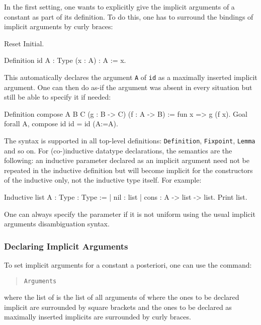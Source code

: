 In the first setting, one wants to explicitly give the implicit
arguments of a constant as part of its definition. To do this, one has
to surround the bindings of implicit arguments by curly braces:
\begin{coq_eval}
Reset Initial.
\end{coq_eval}
\begin{coq_example}
Definition id {A : Type} (x : A) : A := x.
\end{coq_example}

This automatically declares the argument {\tt A} of {\tt id} as a
maximally inserted implicit argument. One can then do as-if the argument
was absent in every situation but still be able to specify it if needed:
\begin{coq_example}
Definition compose {A B C} (g : B -> C) (f : A -> B) := 
  fun x => g (f x).
Goal forall A, compose id id = id (A:=A).
\end{coq_example}

The syntax is supported in all top-level definitions: {\tt Definition},
{\tt Fixpoint}, {\tt Lemma} and so on. For (co-)inductive datatype
declarations, the semantics are the following: an inductive parameter
declared as an implicit argument need not be repeated in the inductive
definition but will become implicit for the constructors of the
inductive only, not the inductive type itself. For example:

\begin{coq_example}
Inductive list {A : Type} : Type :=
| nil : list
| cons : A -> list -> list.
Print list.
\end{coq_example}

One can always specify the parameter if it is not uniform using the
usual implicit arguments disambiguation syntax.

\subsubsection{Declaring Implicit Arguments}

To set implicit arguments for a constant a posteriori, one can use the
command:
\begin{quote}
\tt Arguments {\qualid} \nelist{\possiblybracketedident}{}
\end{quote}
where the list of {\possiblybracketedident} is the list of all arguments of
{\qualid} where the ones to be declared implicit are surrounded by
square brackets and the ones to be declared as maximally inserted implicits
are surrounded by curly braces.

